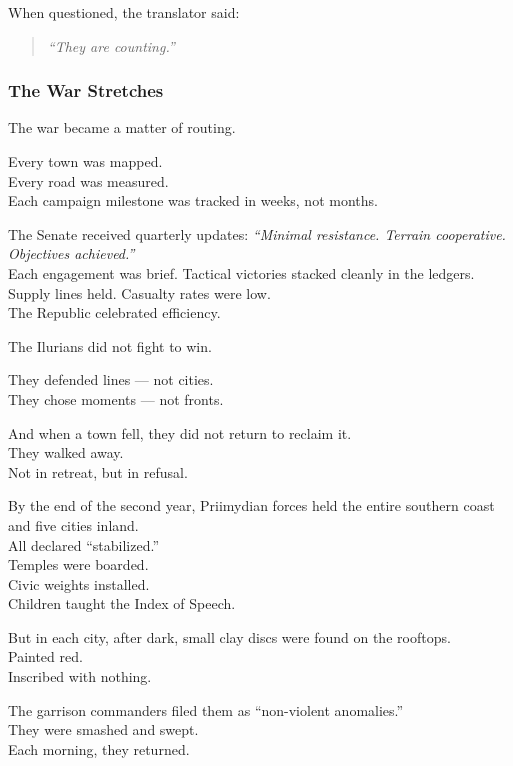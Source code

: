 \documentclass[12pt]{article}
\begin{document}
When questioned, the translator said:

\begin{quote}
\textit{“They are counting.”}
\end{quote}

\dotfill

\subsubsection*{The War Stretches}

The war became a matter of routing.

Every town was mapped.\\
Every road was measured.\\
Each campaign milestone was tracked in weeks, not months.

The Senate received quarterly updates: \textit{“Minimal resistance. Terrain cooperative. Objectives achieved.”}\\
Each engagement was brief. Tactical victories stacked cleanly in the ledgers.\\
Supply lines held. Casualty rates were low.\\
The Republic celebrated efficiency.

\vspace{1em}

The Ilurians did not fight to win.

They defended lines — not cities.\\
They chose moments — not fronts.

And when a town fell, they did not return to reclaim it.\\
They walked away.\\
Not in retreat, but in refusal.

\vspace{1em}

By the end of the second year, Priimydian forces held the entire southern coast and five cities inland.\\
All declared “stabilized.”\\
Temples were boarded.\\
Civic weights installed.\\
Children taught the Index of Speech.

But in each city, after dark, small clay discs were found on the rooftops.\\
Painted red.\\
Inscribed with nothing.

The garrison commanders filed them as “non-violent anomalies.”\\
They were smashed and swept.\\
Each morning, they returned.
\end{document}
